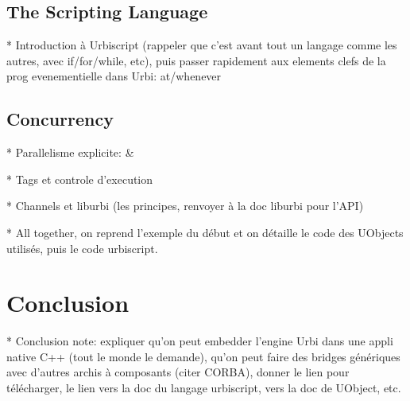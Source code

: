 \subsection{The \us Scripting Language}
\begin{todo}
  * Introduction à Urbiscript (rappeler que c'est avant tout un
  langage comme les autres, avec if/for/while, etc), puis passer
  rapidement aux elements clefs de la prog evenementielle dans Urbi:
  at/whenever
\end{todo}

\subsection{Concurrency}
\begin{todo}
  * Parallelisme explicite: \&

  * Tags et controle d'execution

  * Channels et liburbi (les principes, renvoyer à la doc liburbi pour
  l'API)

  * All together, on reprend l'exemple du début et on détaille le code
  des UObjects utilisés, puis le code urbiscript.
\end{todo}

\section{Conclusion}
\begin{todo}
  * Conclusion note: expliquer qu'on peut embedder l'engine Urbi dans
  une appli native C++ (tout le monde le demande), qu'on peut faire
  des bridges génériques avec d'autres archis à composants (citer
  CORBA), donner le lien pour télécharger, le lien vers la doc du
  langage urbiscript, vers la doc de UObject, etc.
\end{todo}


